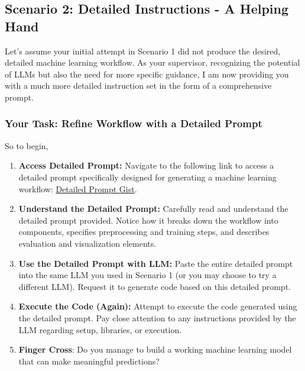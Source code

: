 
\newpage
\subsection{Scenario 2: Detailed Instructions - A Helping Hand}

Let's assume your initial attempt in Scenario 1 did not produce the desired, detailed machine learning workflow. As your supervisor, recognizing the potential of LLMs but also the need for more specific guidance, I am now providing you with a much more detailed instruction set in the form of a comprehensive prompt.

\subsubsection{Your Task: Refine Workflow with a Detailed Prompt}


So to begin,
\begin{enumerate}
    \item \textbf{Access Detailed Prompt:} Navigate to the following link to access a detailed prompt specifically designed for generating a machine learning workflow: \href{https://github.com/your-repo/your-ml-prompt.md}{Detailed Prompt Gist}.

    \item \textbf{Understand the Detailed Prompt:} Carefully read and understand the detailed prompt provided. Notice how it breaks down the workflow into components, specifies preprocessing and training steps, and describes evaluation and visualization elements.

    \item \textbf{Use the Detailed Prompt with LLM:}  Paste the entire detailed prompt into the same LLM you used in Scenario 1 (or you may choose to try a different LLM). Request it to generate code based on this detailed prompt.

    \item \textbf{Execute the Code (Again):} Attempt to execute the code generated using the detailed prompt.  Pay close attention to any instructions provided by the LLM regarding setup, libraries, or execution.

    \item \textbf{Finger Cross}: Do you manage to build a working machine learning model that can make meaningful predictions?


\end{enumerate}

